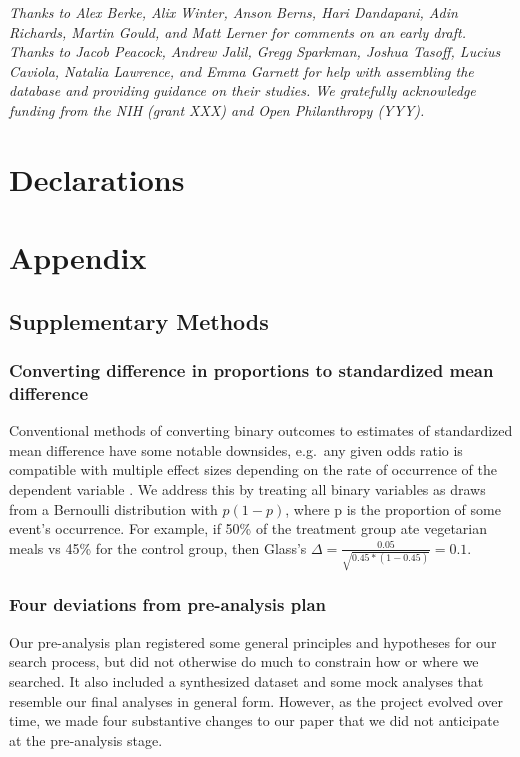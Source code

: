 \documentclass[sn-nature,referee,pdflatex]{sn-jnl}
\begin{document}

\emph{Thanks to Alex Berke, Alix Winter, Anson Berns, Hari Dandapani,
Adin Richards, Martin Gould, and Matt Lerner for comments on an early
draft. Thanks to Jacob Peacock, Andrew Jalil, Gregg Sparkman, Joshua
Tasoff, Lucius Caviola, Natalia Lawrence, and Emma Garnett for help with
assembling the database and providing guidance on their studies. We
gratefully acknowledge funding from the NIH (grant XXX) and Open
Philanthropy (YYY).}

\section*{Declarations}\label{declarations}

\newpage

\section{Appendix}\label{Sec5}

\subsection{Supplementary Methods}\label{Sec5.1}

\subsubsection{Converting difference in proportions to standardized mean
difference}\label{Sec5.1.1}

Conventional methods of converting binary outcomes to estimates of
standardized mean difference have some notable downsides, e.g.~any given
odds ratio is compatible with multiple effect sizes depending on the
rate of occurrence of the dependent variable \citep{gomila2021}. We
address this by treating all binary variables as draws from a Bernoulli
distribution with \(p(1 - p)\), where p is the proportion of some
event's occurrence. For example, if 50\% of the treatment group ate
vegetarian meals vs 45\% for the control group, then Glass's
\(\Delta = \frac{0.05}{\sqrt{0.45 * (1-0.45)}} = 0.1\).

\subsubsection{Four deviations from pre-analysis plan}\label{Sec5.1.2}

Our pre-analysis plan registered some general principles and hypotheses
for our search process, but did not otherwise do much to constrain how
or where we searched. It also included a synthesized dataset and some
mock analyses that resemble our final analyses in general form. However,
as the project evolved over time, we made four substantive changes to
our paper that we did not anticipate at the pre-analysis stage.
\end{document}
